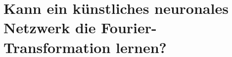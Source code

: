 %
%
%
%
\chapter{Kann ein künstliches neuronales Netzwerk die Fourier-Transformation lernen?\label{chapter:ml}}
\begin{refsection}
%






\printbibliography[heading=subbibliography]
\end{refsection}

